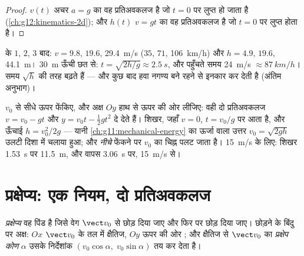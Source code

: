 \begin{proof}
$v(t)$ अचर $a = g$ का वह प्रतिअवकलज है जो $t = 0$ पर लुप्त हो जाता है
(\cref{ch:g12:kinematics-2d}); और $h(t)$ $v = gt$ का वह प्रतिअवकलज है जो $t = 0$ पर लुप्त होता है।
\end{proof}

\begin{example}[परिमाण की कोटियाँ]\label{ex:g12:projectile-motion:orders}
 के $1$, $2$, $3$  बाद: $v = 9.8$, $19.6$, \qty{29.4}{m/s}
($35$, $71$, \qty{106}{km/h}) और $h = 4.9$, $19.6$, \qty{44.1}{m}। \qty{30}{m} ऊँची छत से:
$t = \sqrt{2h/g} \approx \qty{2.5}{s}$, और पहुँचते समय \qty{24}{m/s} $\approx \qty{87}{km/h}$। समय $\sqrt h$ की तरह बढ़ते हैं --- और कुछ
 बाद हवा नगण्य बने रहने से इनकार कर देती है (अंतिम अनुभाग)।
\end{example}

\begin{example}[ऊर्ध्वाधर उछाल]\label{ex:g12:projectile-motion:throw}
$v_0$ से सीधे ऊपर फेंकिए, और अक्ष $Oy$ हाथ से ऊपर की ओर लीजिए: वही दो
प्रतिअवकलज $v = v_0 - gt$ और $y = v_0 t - \tfrac12 gt^2$ दे देते हैं। शिखर, जहाँ $v = 0$, $t = v_0/g$ पर आता है,
और ऊँचाई $h = v_0^2/2g$ --- यानी \cref{ch:g11:mechanical-energy} का ऊर्जा वाला उत्तर $v_0 = \sqrt{2gh}$ उलटी दिशा
में चलाया हुआ; और \emph{नीचे} फेंकने पर $v_0$ का चिह्न पलट जाता है। \qty{15}{m/s} के
लिए: शिखर \qty{1.53}{s} पर \qty{11.5}{m}, और वापस \qty{3.06}{s} पर, \qty{15}{m/s} से।
\end{example}

\section{प्रक्षेप्य: एक नियम, दो प्रतिअवकलज}

\begin{definition}[प्रक्षेप्य]\label{def:g12:projectile-motion:projectile}
\emph{प्रक्षेप्य} वह पिंड है जिसे वेग $\vect v_0$ से छोड़ दिया
जाए और फिर  पर छोड़ दिया जाए। छोड़ने के बिंदु पर अक्ष:
$Ox$ $\vect v_0$ के  तल में क्षैतिज, $Oy$ ऊपर की ओर ; और
क्षैतिज से $\vect v_0$ का \emph{प्रक्षेप कोण} $\alpha$ उसके
निर्देशांक $(v_0\cos\alpha,\; v_0\sin\alpha)$ तय कर देता है।
\end{definition}

